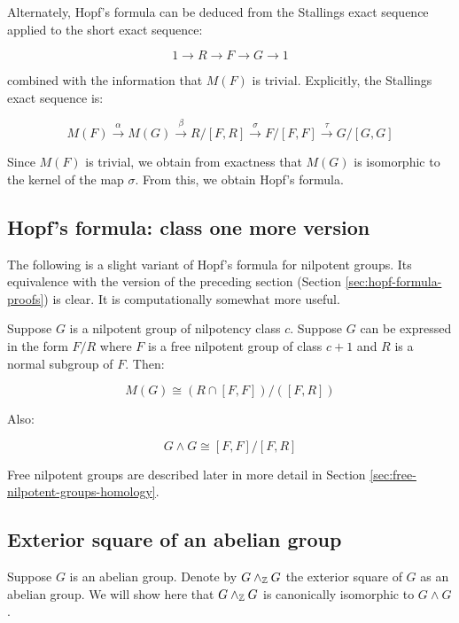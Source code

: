 Alternately, Hopf's formula can be deduced from the Stallings exact
sequence applied to the short exact sequence:

$$1 \to R \to F \to G \to 1$$

combined with the information that $M(F)$ is trivial. Explicitly,
the Stallings exact sequence is:

$$M(F) \stackrel{\alpha}{\to} M(G) \stackrel{\beta}{\to} R/[F,R] \stackrel{\sigma}{\to} F/[F,F] \stackrel{\tau}{\to} G/[G,G]$$

Since $M(F)$ is trivial, we obtain from exactness that $M(G)$ is
isomorphic to the kernel of the map $\sigma$. From this, we obtain
Hopf's formula.

\subsection{Hopf's formula: class one more version}\label{sec:hopf-formula-class-one-more}

The following is a slight variant of Hopf's formula for nilpotent
groups. Its equivalence with the version of the preceding section
(Section \ref{sec:hopf-formula-proofs}) is clear. It is
computationally somewhat more useful.

Suppose $G$ is a nilpotent group of nilpotency class $c$. Suppose $G$
can be expressed in the form $F/R$ where $F$ is a free nilpotent group
of class $c + 1$ and $R$ is a normal subgroup of $F$. Then:

\begin{equation}\label{eq:hopf-formula-class-one-more}
  M(G) \cong (R \cap [F,F])/([F,R])
\end{equation}

Also:

\begin{equation}\label{eq:exteriorsquare-hopf-formula-class-one-more}
  G \wedge G \cong [F,F]/[F,R]
\end{equation}

Free nilpotent groups are described later in more detail in Section
\ref{sec:free-nilpotent-groups-homology}.

\subsection{Exterior square of an abelian group}\label{sec:exteriorsquare-abelian-group-intro}

Suppose $G$ is an abelian group. Denote by $G \wedge_{\mathbb{Z}} G$ the
exterior square of $G$ as an abelian group. We will show here that $G
\wedge_{\mathbb{Z}} G$ is canonically isomorphic to $G \wedge G$.


